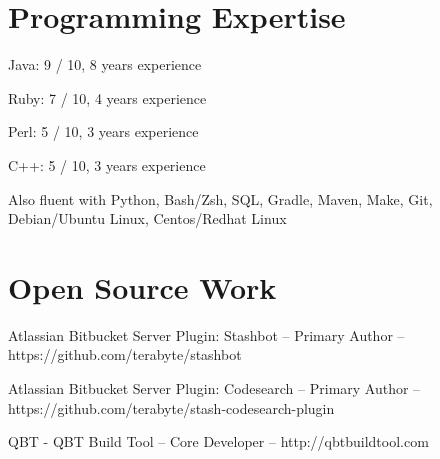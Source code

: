 \documentclass[margin,line]{resume}
\begin{document}
\begin{resume}

	\section{\mysidestyle Programming Expertise} 
	\begin{list2}
	\item 
		Java: 9 / 10, 8 years experience
	\item 
		Ruby: 7 / 10, 4 years experience
	\item
		Perl: 5 / 10, 3 years experience
	\item
		C++: 5 / 10, 3 years experience
	\item
		Also fluent with Python, Bash/Zsh, SQL, Gradle, Maven, Make, Git, Debian/Ubuntu Linux, Centos/Redhat Linux
	\end{list2}

	\section{\mysidestyle Open Source Work} 
	\begin{list2}
	\item 
		Atlassian Bitbucket Server Plugin: Stashbot -- Primary Author -- https://github.com/terabyte/stashbot
	\item 
		Atlassian Bitbucket Server Plugin: Codesearch -- Primary Author -- https://github.com/terabyte/stash-codesearch-plugin
	\item 
		QBT - QBT Build Tool -- Core Developer -- http://qbtbuildtool.com
	\end{list2}

\end{resume}
\end{document}
